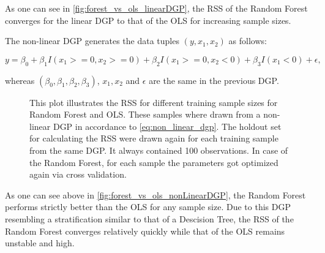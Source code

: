As one can see in \autoref{fig:forest_vs_ols_linearDGP}, the RSS of the Random Forest converges for the linear DGP
to that of the OLS for increasing sample sizes. 

The non-linear DGP generates the data tuples \( (y, x_{1}, x_{2}) \) as follows:

\begin{equation}\label{eq:non_linear_dgp}
    y = \beta_{0} + \beta_{1} I(x_{1} >= 0, x_{2} >= 0) + \beta_{2} I(x_{1} >= 0, x_{2} < 0) + \beta_{3} I(x_{1} < 0) + \epsilon,
\end{equation}

whereas \( (\beta_{0}, \beta_{1}, \beta_{2}, \beta_{3}) \), \( x_{1}, x_{2} \) and \(  \epsilon \)
are the same in the previous DGP.

\begin{figure}[H]
    \captionsetup{format=plain}
    \caption
        {This plot illustrates the RSS for different training sample sizes for Random Forest and OLS.
        These samples where drawn from a non-linear DGP in accordance to \autoref{eq:non_linear_dgp}.
        The holdout set for calculating the RSS were drawn again for each training sample from the same DGP.
        It always contained 100 observations. In case of the Random Forest, for each sample the parameters
        got optimized again via cross validation.
        }
    \label{fig:forest_vs_ols_nonLinearDGP}
\end{figure}

As one can see above in \autoref{fig:forest_vs_ols_nonLinearDGP}, the Random Forest performs strictly better
than the OLS for any sample size. Due to this DGP resembling a stratification similar to
that of a Descision Tree, the RSS of the Random Forest converges relatively quickly while that of the OLS
remains unstable and high. 